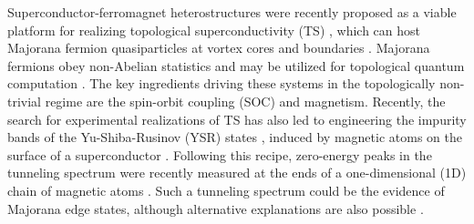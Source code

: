 \documentclass[twocolumn,showpacs,floatfix,nofootinbib,longbibliography]{revtex4-1}
\begin{document}
Superconductor-ferromagnet heterostructures were recently proposed as a viable platform for realizing topological superconductivity (TS) \cite{Lutchyn2010,Oreg2010, Sau2010}, which can host Majorana fermion quasiparticles at vortex cores and boundaries \cite{Kitaev2001, Alicea, Beenakker2013}. Majorana fermions obey non-Abelian statistics and may be utilized for topological quantum computation \cite{Read2000, Ivanov2001, Nayak2008}.  The key ingredients driving these systems in the topologically non-trivial regime are the spin-orbit coupling (SOC) and magnetism. Recently, the search for experimental realizations of TS has also led to engineering the impurity bands of the Yu-Shiba-Rusinov (YSR) states \cite{Yu,Shiba,Rusinov}, induced by magnetic atoms on the surface of a superconductor \cite{Choy2011, Nadj-Perge2013, Klinovaja2013, Vazifeh2013, Braunecker2013, Pientka2013, Nakosai2013, Poyhonen2014, Reis2014, Brydon2015, Rontynen2014, Li2015}. Following this recipe, zero-energy peaks in the tunneling spectrum were recently measured at the ends of a one-dimensional (1D) chain of magnetic atoms \cite{Yazdani2014}. Such a tunneling spectrum could be the evidence of Majorana edge states, although alternative explanations are also possible \cite{Sau2015}.
\end{document}
